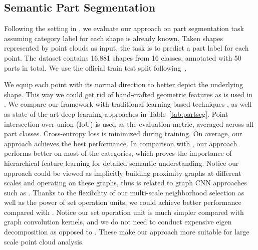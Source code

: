 \subsection{Semantic Part Segmentation}
Following the setting in \cite{Yi16}, we evaluate our approach on part segmentation task assuming category label for each shape is already known. Taken shapes represented by point clouds as input, the task is to predict a part label for each point. The dataset contains 16,881 shapes from 16 classes, annotated with 50 parts in total. We use the official train test split following~\cite{shapenet2015}.

We equip each point with its normal direction to better depict the underlying shape. This way we could get rid of hand-crafted geometric features as is used in \cite{Yi16,yi2016syncspeccnn}. 
We compare our framework with traditional learning based techniques \cite{Yi16}, as well as state-of-the-art deep learning approaches \cite{qi2016pointnet,yi2016syncspeccnn} in Table~\ref{tab:partseg}. Point intersection over union (IoU) is used as the evaluation metric, averaged across all part classes. Cross-entropy loss is minimized during training. On average, our approach achieves the best performance. In comparison with \cite{qi2016pointnet}, our approach performs better on most of the categories, which proves the importance of hierarchical feature learning for detailed semantic understanding. Notice our approach could be viewed as implicitly building proximity graphs at different scales and operating on these graphs, thus is related to graph CNN approaches such as \cite{yi2016syncspeccnn}. Thanks to the flexibility of our multi-scale neighborhood selection as well as the power of set operation units, we could achieve better performance compared with \cite{yi2016syncspeccnn}. Notice our set operation unit is much simpler compared with graph convolution kernels, and we do not need to conduct expensive eigen decomposition as opposed to \cite{yi2016syncspeccnn}. These make our approach more suitable for large scale point cloud analysis.
